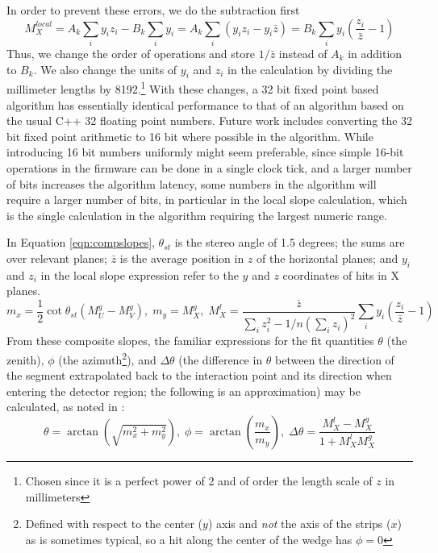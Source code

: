 In order to prevent these errors, we do the subtraction first
\begin{equation}
M_X^{local}=A_k\sum_iy_iz_i-B_k\sum_iy_i=A_k\sum_i\left(y_iz_i-y_i\bar{z}\right)=B_k\sum_iy_i\left(\frac{z_i}{\bar{z}}-1\right)
\end{equation}
Thus, we change the order of operations and store $1/\bar{z}$ instead of $A_k$ in addition to $B_k$.  We also change the units of $y_i$ and $z_i$ in the calculation by dividing the millimeter lengths by 8192.\footnote{Chosen since it is a perfect power of 2 and of order the length scale of $z$ in millimeters}  With these changes, a 32 bit fixed point based algorithm has essentially identical performance to that of an algorithm based on the usual C++ 32 floating point numbers.  Future work includes converting the 32 bit fixed point arithmetic to 16 bit where possible in the algorithm.  While introducing 16 bit numbers uniformly might seem preferable, since simple 16-bit operations in the firmware can be done in a single clock tick, and a larger number of bits increases the algorithm latency, some numbers in the algorithm will require a larger number of bits, in particular in the local slope calculation, which is the single calculation in the algorithm requiring the largest numeric range.

  In Equation \ref{eqn:compslopes}, $\theta_{st}$ is the stereo angle of 1.5 degrees; the sums are over relevant planes; $\bar{z}$ is the average position in $z$ of the horizontal planes; and $y_i$ and $z_i$ in the local slope expression refer to the $y$ and $z$ coordinates of hits in X planes.
\begin{equation}
\label{eqn:compslopes}
m_x=\frac{1}{2}\cot\theta_{st}\left(M_U^{g}-M_V^{g}\right),\;m_y=M_X^{g},\;M_X^{l}=\frac{\bar{z}}{\sum_i z_i^2-1/n\left(\sum_iz_i\right)^2}\sum_iy_i\left(\frac{z_i}{\bar{z}}-1\right)
\end{equation}
From these composite slopes, the familiar expressions for the fit quantities $\theta$ (the zenith), $\phi$ (the azimuth\footnote{Defined with respect to the center ($y$) axis and \emph{not} the axis of the strips ($x$) as is sometimes typical, so a hit along the center of the wedge has $\phi=0$}), and $\Delta\theta$ (the difference in $\theta$ between the direction of the segment extrapolated back to the interaction point and its direction when entering the detector region; the following is an approximation) may be calculated, as noted in \cite{blcnote}:
\begin{equation}
\label{eqn:big3}
\theta=\arctan\left(\sqrt{m_x^2+m_y^2}\right),\;\phi=\arctan\left(\frac{m_x}{m_y}\right),\;\Delta\theta=\frac{M_X^{l}-M_X^{g}}{1+M_X^{l}M_X^{g}}
\end{equation}

